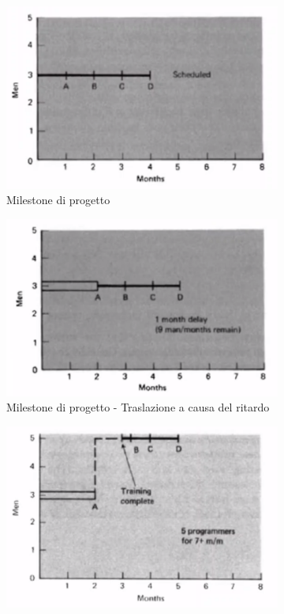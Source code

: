 \begin{figure}[H]
	\centering
	\begin{subfigure}{.32\textwidth}
		\centering
		\includegraphics[width=\linewidth]{document/img/milestones.PNG}
		\caption{Milestone di progetto}
	\end{subfigure}
	\begin{subfigure}{.32 \textwidth}
		\centering
		\includegraphics[width=\linewidth]{document/img/milestonelate.PNG}
		\caption{Milestone di progetto - Traslazione a causa del ritardo}
	\end{subfigure}
	\begin{subfigure}{.32 \textwidth}
		\centering
		\includegraphics[width=\linewidth]{document/img/milestonepiuersonale.PNG}

\end{subfigure}
\end{figure}
